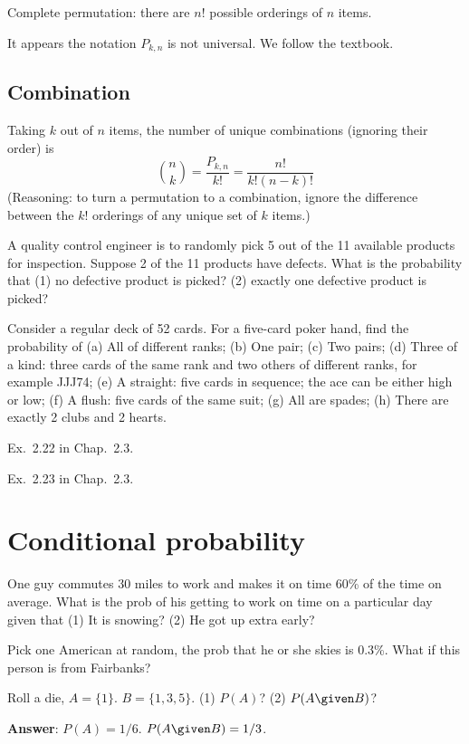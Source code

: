 \documentclass[12pt]{article}
\begin{document}
Complete permutation:
there are $n!$ possible orderings of $n$ items.

\alert
It appears the notation $P_{k,n}$ is not universal.
We follow the textbook.

\subsection*{Combination}

Taking $k$ out of $n$ items,
the number of unique combinations (ignoring their order) is
\[
{n \choose k} = \frac{P_{k,n}}{k!} = \frac{n!}{k! (n-k)!}
\]
(Reasoning:
to turn a permutation to a combination,
ignore the difference between the $k!$ orderings
of any unique set of $k$ items.)

\example
A quality control engineer is to randomly pick 5 out of the 11 available
products for inspection. Suppose 2 of the 11 products have defects.
What is the probability that (1) no defective product is picked?
(2) exactly one defective product is picked?

\example
Consider a regular deck of 52 cards.
For a five-card poker hand, find the probability of
(a) All of different ranks;
(b) One pair;
(c) Two pairs;
(d) Three of a kind: three cards of the same rank and two others of
different ranks, for example JJJ74;
(e) A straight: five cards in sequence; the ace can be either high or
low;
(f) A flush: five cards of the same suit;
(g) All are spades;
(h) There are exactly 2 clubs and 2 hearts.

\exercise
Ex.~2.22 in Chap.~2.3.

\exercise
Ex.~2.23 in Chap.~2.3.



\section{Conditional probability}

\example
One guy commutes 30 miles to work and makes it on time 60\% of the time
on average. What is the prob of his getting to work on time on a
particular day given that (1) It is snowing? (2) He got up extra
early?

\example
Pick one American at random, the prob that
he or she skies is 0.3\%.
What if this person is from Fairbanks?

\example Roll a die, $A = \{1\}$. $B = \{1,3,5\}$.
(1) $P(A)$? (2) $P(A \given B)$?

\textbf{Answer}: $P(A) = 1/6$.  $P(A \given B) = 1/3$.
\end{document}
